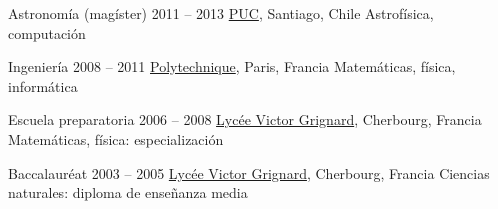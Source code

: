 
\def\tbflanguage{spanish}
\def\tbfbordertop{1}
\def\tbfborderleft{0.7}








\begin{coordinatelist}
\end{coordinatelist}




\begin{yearlist}[7.7][\tbfborderleft][4]

\item[Astronomía (magíster)]{2011 -- 2013}
	{
	\href{http://www.uc.cl/}{PUC}, Santiago, Chile
	}
  {    Astrofísica, computación}
    

\item[Ingeniería]{2008 -- 2011}
	{
	\href{https://www.polytechnique.edu/}{Polytechnique}, Paris, Francia
	}
  {    Matemáticas, física, informática}


\item[Escuela preparatoria]{2006 -- 2008}
	{
	\href{http://www.lycee-grignard.fr/}{Lycée Victor Grignard}, Cherbourg, Francia
	}
	{    Matemáticas, física: especialización}


\item[Baccalaur\'eat]{2003 -- 2005}
	{
	\href{http://www.lycee-grignard.fr/}{Lycée Victor Grignard}, Cherbourg, Francia
	}
  {    Ciencias naturales: diploma de enseñanza media}
    
\end{yearlist}


